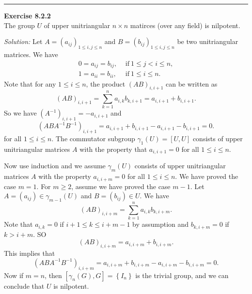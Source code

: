 \documentclass[a4paper, 12pt]{article}
\newenvironment{problem}[2][Exercise]
    { \begin{mdframed}[backgroundcolor=gray!20] \textbf{#1 #2} \\}
    {  \end{mdframed}}
\newenvironment{solution}
    {\textit{Solution:}}
    {}
\begin{document}
\noindent\rule{7in}{2.8pt}
\begin{problem}{8.2.2}
The group \(U\) of upper unitriangular \(n\times n\) matirces (over any field) is nilpotent.
\end{problem}
\begin{solution}
Let \(A=(a_{ij})_{1\leq i,j\leq n}\) and \(B=(b_{ij})_{1\leq i,j\leq n}\) be two unitriangular matrices. We have 
\begin{align*}
    0=a_{ij}=b_{ij},\ &\, \text{if}\ 1\leq j<i\leq n,\\ 
    1=a_{ii}=b_{ii},\ &\, \text{if}\ 1\leq i\leq n.
\end{align*}
Note that for any \(1\leq i\leq n\), the product \((AB)_{i,i+1}\) can be written as 
\[(AB)_{i,i+1}=\sum_{k=1}^{n}a_{i,k}b_{k,i+1}=a_{i,i+1}+b_{i,i+1}.\]
So we have \((A^{-1})_{i,i+1}=-a_{i,i+1}\) and 
\[(ABA^{-1}B^{-1})_{i,i+1}=a_{i,i+1}+b_{i,i+1}-a_{i,i+1}-b_{i,i+1}=0.\]
for all \(1\leq i\leq n\). The commutator subgroup \(\gamma_1(U)=[U,U]\) consists of upper unitriangular matrices \(A\) with the property that \(a_{i,i+1}=0\) for all \(1\leq i\leq n\). 

Now use induction and we assume \(\gamma_m(U)\) consists of upper unitriangular matrices \(A\) with the property \(a_{i,i+m}=0\) for all \(1\leq i\leq n\). We have proved the case \(m=1\). For \(m\geq 2\), assume we have proved the case \(m-1\). 
Let \(A=(a_{ij})\in \gamma_{m-1}(U)\) and \(B=(b_{ij})\in U\). We have 
\[(AB)_{i,i+m}=\sum_{k=1}^{n}a_{i,k}b_{k,i+m}.\]
Note that \(a_{i,k}=0\) if \(i+1\leq k\leq i+m-1\) by assumption and \(b_{k,i+m}=0\) if \(k>i+m\). SO 
\[(AB)_{i,i+m}=a_{i,i+m}+b_{i,i+m}.\]
This implies that 
\[(ABA^{-1}B^{-1})_{i,i+m}=a_{i,i+m}+b_{i,i+m}-a_{i,i+m}-b_{i,i+m}=0.\]
Now if \(m=n\), then \([\gamma_n(G),G]=\left\{ I_n \right\}\) is the trivial group, and we can conclude that \(U\) is nilpotent.
\end{solution}
\end{document}
